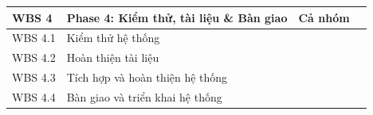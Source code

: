 \begin{longtable}{|C{0.13\textwidth}|C{0.43\textwidth}|C{0.27\textwidth}|C{0.11\textwidth}|}

\textbf{WBS 4} &
\textbf{Phase 4: Kiểm thử, tài liệu \& Bàn giao} &
\textbf{Cả nhóm} & \\

\hline

WBS 4.1 &
Kiểm thử hệ thống & & \\

\hline

WBS 4.2 &
Hoàn thiện tài liệu & & \\

\hline

WBS 4.3 &
Tích hợp và hoàn thiện hệ thống & & \\

\hline

WBS 4.4 &
Bàn giao và triển khai hệ thống & & \\

\hline

\end{longtable}